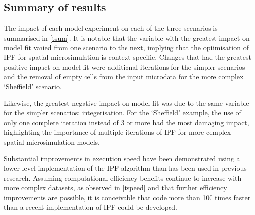 \documentclass[a4paper,10pt]{article}
\begin{document}
\subsection{Summary of results}

The impact of each model experiment on each of the three scenarios
is summarised in \cref{tsum}. It is notable that the variable with the
greatest impact on model fit varied from one scenario to the next,
implying that the optimisation of IPF for spatial microsimulation is
context-specific. Changes that had the greatest positive impact on model
fit were additional iterations for the simpler scenarios and the removal of
empty cells from the input microdata for the more complex `Sheffield' scenario.

Likewise, the greatest negative impact on model fit was due to the same variable
for the simpler scenarios: integerisation. For the `Sheffield' example, the
use of only one complete iteration instead of 3 or more had the most damaging impact,
highlighting the importance of multiple iterations of IPF for more complex
spatial microsimulation models.

Substantial improvements in execution speed have been demonstrated using a lower-level
implementation of the IPF algorithm than has been used in previous research. Assuming
computational efficiency benefits continue to increase with more complex datasets,
as observed in \cref{tspeed} and that further efficiency improvements
are possible, it is conceivable that
code more than 100 times faster than a recent
implementation of IPF \citep{Lovelace2013-trs} could be developed.
\end{document}
